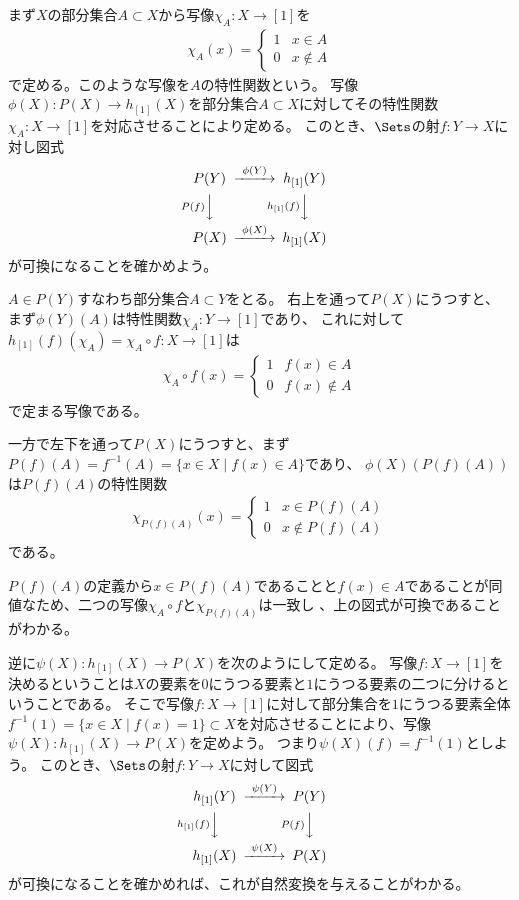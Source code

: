 \documentclass[uplatex]{jsarticle}
\begin{document}
\vspace{5pt}

まず$X$の部分集合$A \subset X$から写像$\chi_A:X \to [1]$を
\begin{align*}
\chi_A(x)=\begin{cases} 1 & x \in A\\ 0 & x \notin A\end{cases}
\end{align*}
で定める。このような写像を$A$の特性関数という。
写像$\phi(X):P(X) \to h_{[1]}(X)$を部分集合$A \subset X$に対してその特性関数$\chi_A:X \to [1]$を対応させることにより定める。
このとき、$\Sets$の射$f:Y \to X$に対し図式
\begin{align*}
\begin{CD}
P(Y)@>\phi(Y)>>h_{[1]}(Y)\\
@VP(f)VV@Vh_{[1]}(f)VV\\
P(X)@>\phi(X)>>h_{[1]}(X)
\end{CD}
\end{align*}
が可換になることを確かめよう。

$A \in P(Y)$すなわち部分集合$A\subset Y$をとる。
右上を通って$P(X)$にうつすと、まず$\phi(Y)(A)$は特性関数$\chi_A:Y \to [1]$であり、
これに対して$h_{[1]}(f)(\chi_A)=\chi_A\circ f:X \to [1]$は
\begin{align*}
\chi_A\circ f(x)=\begin{cases} 1 & f(x) \in A\\ 0 & f(x) \notin A\end{cases}
\end{align*}
で定まる写像である。

一方で左下を通って$P(X)$にうつすと、まず$P(f)(A)=f^{-1}(A)=\{x\in X\mid f(x) \in A\}$であり、
$\phi(X)(P(f)(A))$は$P(f)(A)$の特性関数
\begin{align*}
\chi_{P(f)(A)}(x)=\begin{cases} 1 & x \in P(f)(A)\\ 0 & x \notin P(f)(A)\end{cases}
\end{align*}
である。

$P(f)(A)$の定義から$x\in P(f)(A)$であることと$f(x) \in A$であることが同値なため、二つの写像$\chi_A \circ f$と$\chi_{P(f)(A)}$は一致し
、上の図式が可換であることがわかる。
\vspace{5pt}

逆に$\psi(X):h_{[1]}(X) \to P(X)$を次のようにして定める。
写像$f:X \to [1]$を決めるということは$X$の要素を$0$にうつる要素と$1$にうつる要素の二つに分けるということである。
そこで写像$f:X \to [1]$に対して部分集合を$1$にうつる要素全体$f^{-1}(1)=\{x \in X \mid f(x)=1\} \subset X$を対応させることにより、写像$\psi(X):h_{[1]}(X) \to P(X)$を定めよう。
つまり$\psi(X)(f)=f^{-1}(1)$としよう。
このとき、$\Sets$の射$f:Y \to X$に対して図式
\begin{align*}
\begin{CD}
h_{[1]}(Y)@>\psi(Y)>>P(Y)\\
@Vh_{[1]}(f)VV@VP(f)VV\\
h_{[1]}(X)@>\psi(X)>>P(X)
\end{CD}
\end{align*}
が可換になることを確かめれば、これが自然変換を与えることがわかる。
\end{document}
